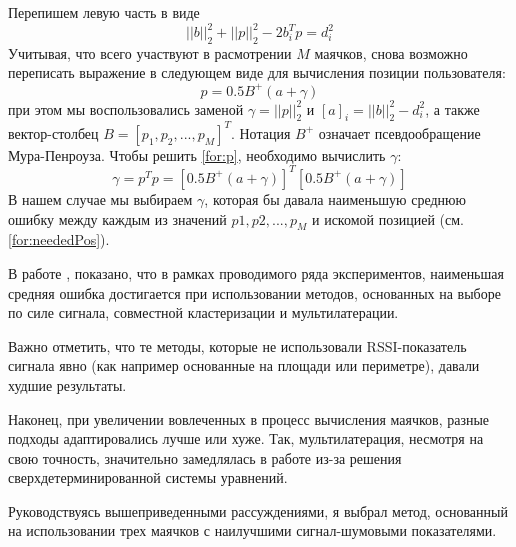 \begin{enumerate}
\[    \]
    Перепишем левую часть в виде
    \begin{equation} \label{for:neededPos}
            || b ||^2_2 + || p ||^2_2 - 2b_i^Tp = d_i^2    
    \end{equation}
    Учитывая, что всего участвуют в расмотрении $M$ маячков, снова возможно переписать выражение в следующем виде для вычисления позиции пользователя:
    \begin{equation} \label{for:p}
        p = 0.5B^+(a+\gamma)    
    \end{equation}
    при этом мы воспользовались заменой $\gamma = || p ||^2_2$ и $[a]_i = || b ||^2_2 - d_i^2$, а также вектор-столбец $B = [p_1, p_2, ..., p_M]^T$. Нотация $B^+$ означает псевдообращение Мура-Пенроуза. Чтобы решить \ref{for:p}, необходимо вычислить $\gamma$:
    \[
        \gamma = p^T p = [0.5B^+(a+\gamma)]^T [0.5B^+(a+\gamma)]
    \]
    В нашем случае мы выбираем $\gamma$, которая бы давала наименьшую среднюю ошибку между каждым из значений $p1, p2, ..., p_M$ и искомой позицией (см. \ref{for:neededPos}). \\
\end{enumerate}

    В работе \cite{artemenko2012comparison}, показано, что в рамках проводимого ряда экспериментов, наименьшая средняя ошибка достигается при использовании методов, основанных на выборе по силе сигнала, совместной кластеризации и мультилатерации. 
    
    Важно отметить, что те методы, которые не использовали RSSI-показатель сигнала явно (как например основанные на площади или периметре), давали худшие результаты. 
    
    Наконец, при увеличении вовлеченных в процесс вычисления маячков, разные подходы адаптировались лучше или хуже. Так, мультилатерация, несмотря на свою точность, значительно замедлялась в работе из-за решения сверхдетерминированной системы уравнений. 
    
    Руководствуясь вышеприведенными рассуждениями, я выбрал метод, основанный на использовании трех маячков с наилучшими сигнал-шумовыми показателями.